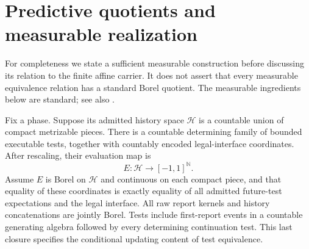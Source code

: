 \section{Predictive quotients and measurable realization}\label{sec:quotient}
For completeness we state a sufficient measurable construction before discussing its relation to the finite affine carrier. It does not assert that every measurable equivalence relation has a standard Borel quotient. The measurable ingredients below are standard; see also \cite{kechris}.

Fix a phase. Suppose its admitted history space $\mathcal H$ is a countable union of compact metrizable pieces. There is a countable determining family of bounded executable tests, together with countably encoded legal-interface coordinates. After rescaling, their evaluation map is
\[
 E:\mathcal H\longrightarrow[-1,1]^{\mathbb N}.
\]
Assume $E$ is Borel on $\mathcal H$ and continuous on each compact piece, and that equality of these coordinates is exactly equality of all admitted future-test expectations and the legal interface. All raw report kernels and history concatenations are jointly Borel. Tests include first-report events in a countable generating algebra followed by every determining continuation test. This last closure specifies the conditional updating content of test equivalence.

